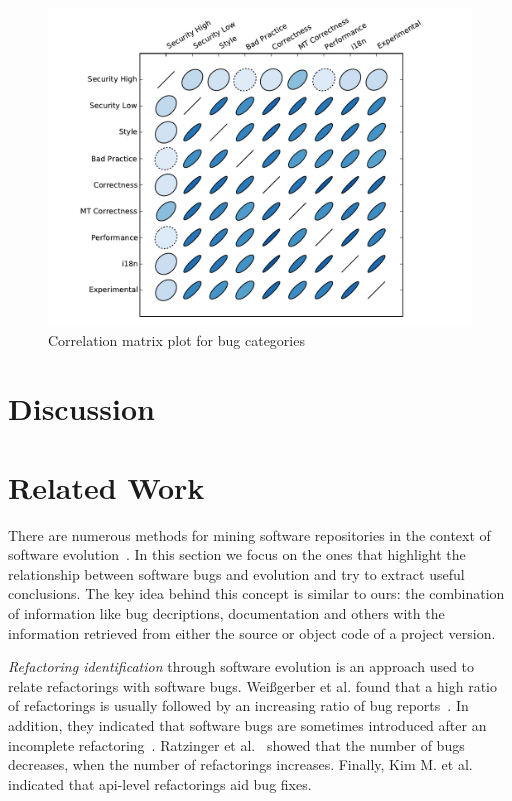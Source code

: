 \documentclass[conference]{IEEEtran}
\begin{document}
\begin{figure}
  \centering
  \includegraphics[scale=0.6]{corrplot.pdf}
  \caption{Correlation matrix plot for bug categories}
  \label{fig:corrplot}
\end{figure}

\section{Discussion}
\label{sec:dis}

\section{Related Work}
\label{sec:rel}

There are numerous methods for mining software repositories in the context
of software evolution~\cite{KCM07}. In this section we focus on the ones
that highlight the relationship between software bugs and evolution and try to
extract useful conclusions. The key idea behind this concept is
similar to ours: the combination of information like bug decriptions,
documentation and others with the information retrieved from either the source
or object code of a project version.

{\it Refactoring identification} through software evolution is an approach used to
relate refactorings with software bugs. Wei{\ss}gerber et al. found that a high
ratio of refactorings is usually followed by an increasing ratio of bug
reports~\cite{WD06}. In addition, they indicated that software bugs are sometimes introduced
after an incomplete refactoring~\cite{GW05}.
Ratzinger et al.~\cite{RSG08} showed that the number of bugs decreases, when the number of
refactorings increases. Finally, Kim M. et al.~\cite{KCK11} indicated that {\sc api}-level
refactorings aid bug fixes.
\end{document}
